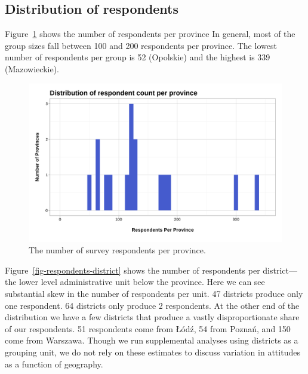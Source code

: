 \documentclass[
  10,
  letterpaper,
  DIV=11,
  numbers=noendperiod]{scrartcl}
\begin{document}
\hypertarget{distribution-of-respondents}{%
\subsection{Distribution of
respondents}\label{distribution-of-respondents}}

Figure~\ref{fig-respondents-province} shows the number of respondents
per province In general, most of the group sizes fall between 100 and
200 respondents per province. The lowest number of respondents per group
is 52 (Opolskie) and the highest is 339 (Mazowieckie).

\begin{figure}

{\centering \includegraphics{../Figures/distribution-responses-province.png}

}

\caption{\label{fig-respondents-province}The number of survey
respondents per province.}

\end{figure}

Figure~\ref{fig-respondents-district} shows the number of respondents
per district---the lower level administrative unit below the province.
Here we can see substantial skew in the number of respondents per unit.
47 districts produce only one respondent. 64 districts only produce 2
respondents. At the other end of the distribution we have a few
districts that produce a vastly disproportionate share of our
respondents. 51 respondents come from Łódź, 54 from Poznań, and 150 come
from Warszawa. Though we run supplemental analyses using districts as a
grouping unit, we do not rely on these estimates to discuss variation in
attitudes as a function of geography.
\end{document}

